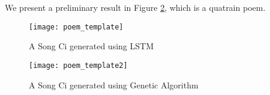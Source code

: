 We present a preliminary result in Figure \ref{fig:poetry}, which is a quatrain poem.

\begin{figure}[htbp]
	\centering
	\texttt{[image: poem\_template]}
	\caption{A Song Ci generated using LSTM}
	\label{fig:poetry}
\end{figure}

\begin{figure}[htbp]
	\centering
	\texttt{[image: poem\_template2]}
	\caption{A Song Ci generated using Genetic Algorithm }
	\label{fig:poetry}
\end{figure}

